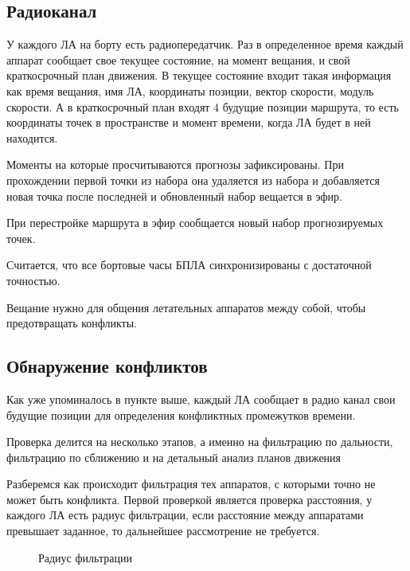 \documentclass[a4paper,12pt]{article}
\begin{document}

\subsection{Радиоканал}
У каждого ЛА на борту есть радиопередатчик. Раз в определенное время каждый аппарат сообщает свое текущее состояние, на момент вещания, и свой краткосрочный план движения. В текущее состояние входит такая информация как время вещания, имя ЛА, координаты позиции, вектор скорости, модуль скорости. А в краткосрочный план входят 4 будущие позиции маршрута, то есть координаты точек в пространстве и момент времени, когда ЛА будет в ней находится. 

Моменты на которые просчитываются прогнозы зафиксированы. При прохождении первой точки из набора она удаляется из набора и добавляется новая точка после последней и обновленный набор вещается в эфир.

При перестройке маршрута в эфир сообщается новый набор прогнозируемых точек.

Считается, что все бортовые часы БПЛА синхронизированы с достаточной точностью.

Вещание нужно для общения летательных аппаратов между собой, чтобы предотвращать конфликты.

\subsection{Обнаружение конфликтов}
Как уже упоминалось в пункте выше, каждый ЛА сообщает в радио канал свои будущие позиции для определения конфликтных промежутков времени.

Проверка делится на несколько этапов, а именно на фильтрацию по дальности, фильтрацию по сближению и на детальный анализ планов движения

Разберемся как происходит фильтрация тех аппаратов, с которыми точно не может быть конфликта. 
Первой проверкой является проверка расстояния, у каждого ЛА есть радиус фильтрации, если расстояние между аппаратами превышает заданное, то дальнейшее рассмотрение не требуется. 

\begin{figure}[ht!]
    \caption{Радиус фильтрации}\label{radius_filter}
\end{figure}
\end{document}
